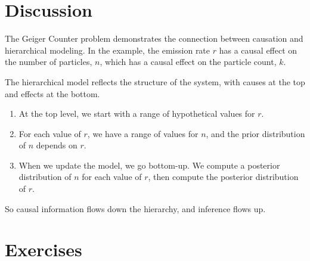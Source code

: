 \documentclass[12pt]{book}
\begin{document}
\section{Discussion}

The Geiger Counter problem demonstrates the connection between
causation and hierarchical modeling.  In the example, the
emission rate $r$ has a causal effect on the number of particles,
$n$, which has a causal effect on the particle count, $k$.

The hierarchical model reflects the structure of the
system, with causes at the top and effects at the bottom.

\begin{enumerate}

\item At the top level, we start with a range of hypothetical
values for $r$.

\item For each value of $r$, we have a range of values for $n$,
and the prior distribution of $n$ depends on $r$.

\item When we update the model, we go bottom-up.  We compute
a posterior distribution of $n$ for each value of $r$, then
compute the posterior distribution of $r$.

\end{enumerate}

So causal information flows down the hierarchy, and inference flows
up.


\section{Exercises}
\end{document}
